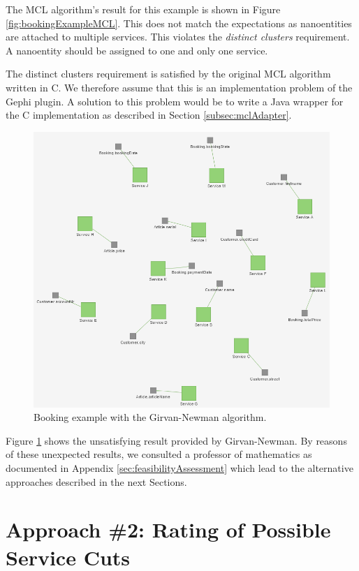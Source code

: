 The MCL algorithm's result for this example is shown in Figure \ref{fig:bookingExampleMCL}. This does not match the expectations as nanoentities are attached to multiple services. This violates the \textit{distinct clusters} requirement. A nanoentity should be assigned to one and only one service. 

The distinct clusters requirement is satisfied by the original MCL algorithm written in C. We therefore assume that this is  an implementation problem of the Gephi plugin\cite{gephiMarkov}. A solution to this problem would be to write a Java wrapper for the C implementation as described in Section \ref{subsec:mclAdapter}.

\begin{figure}[H]
	\begin{center}
		\includegraphics[scale=0.65]{images/girvan_entities_fail.png}
	\end{center}
	\caption{Booking example with the Girvan-Newman algorithm.}
	\label{fig:bookingExampleGirvan}
\end{figure}

Figure \ref{fig:bookingExampleGirvan} shows the unsatisfying result provided by Girvan-Newman. By reasons of these unexpected results, we consulted a professor of mathematics as documented in Appendix \ref{sec:feasibilityAssessment} which lead to the alternative approaches described in the next Sections.
\clearpage
\section{Approach \#2: Rating of Possible Service Cuts}

